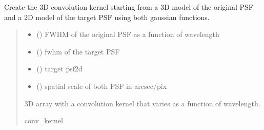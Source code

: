 \documentclass[letterpaper,10pt,english]{sphinxmanual}
\begin{document}
\begin{fulllineitems}
\label{\detokenize{api/pymusepipe:pymusepipe.cube_convolve.convolution_kernel_gaussian}}
\pysigstartsignatures
{}
\pysigstopsignatures
\sphinxAtStartPar
Create the 3D convolution kernel starting from a 3D model of the original
PSF and a 2D model of the target PSF using both gaussian functions.
\begin{quote}\begin{description}
\begin{itemize}
\item {} 
\sphinxAtStartPar
{} () \textendash{} FWHM of the original PSF as a function of
wavelength

\item {} 
\sphinxAtStartPar
{} () \textendash{} fwhm of the target PSF

\item {} 
\sphinxAtStartPar
{} () \textendash{} target psf2d

\item {} 
\sphinxAtStartPar
{} () \textendash{} spatial scale of both PSF in arcsec/pix

\end{itemize}

\sphinxAtStartPar
\begin{description}
\sphinxAtStartPar
3D array with a convolution kernel that varies as a function of
wavelength.

\end{description}


\sphinxAtStartPar
conv\_kernel

\end{description}\end{quote}

\end{fulllineitems}
\end{document}
